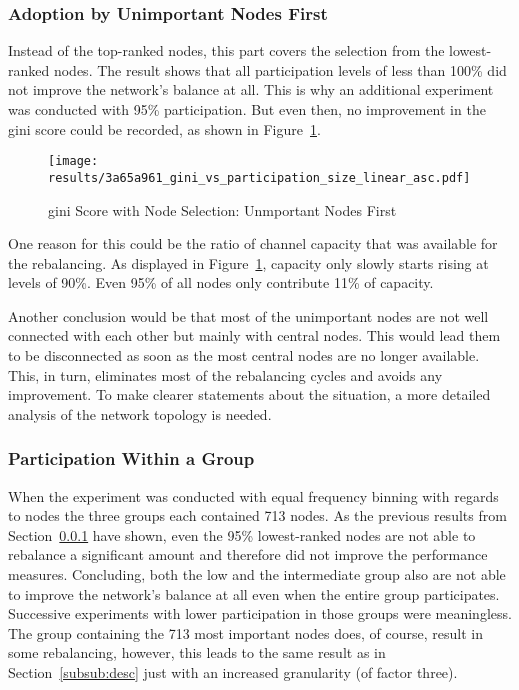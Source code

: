 \documentclass[final]{fhnwreport}       %
\begin{document}
\subsubsection{Adoption by Unimportant Nodes First}\label{subsub:asc}
Instead of the top-ranked nodes, this part covers the selection from the lowest-ranked nodes. The result shows that all participation levels of less than 100\% did not improve the network's balance at all. This is why an additional experiment was conducted with 95\% participation. But even then, no improvement in the \gls{gini} score could be recorded, as shown in Figure~\ref{fig:gini_part_size_linear_asc}.

\begin{figure}[htp]
\centering
\texttt{[image: results/3a65a961\_gini\_vs\_participation\_size\_linear\_asc.pdf]}
\caption{\gls{gini} Score with Node Selection: Unmportant Nodes First}
\label{fig:gini_part_size_linear_asc}
\end{figure}

One reason for this could be the ratio of channel capacity that was available for the rebalancing. As displayed in Figure~\ref{fig:gini_part_size_linear_asc}, capacity only slowly starts rising at levels of 90\%. Even 95\% of all nodes only contribute 11\% of capacity. 

Another conclusion would be that most of the unimportant nodes are not well connected with each other but mainly with central nodes. This would lead them to be disconnected as soon as the most central nodes are no longer available. This, in turn, eliminates most of the rebalancing cycles and avoids any improvement. To make clearer statements about the situation, a more detailed analysis of the network topology is needed.

\subsubsection{Participation Within a Group}
When the experiment was conducted with equal frequency binning with regards to nodes the three groups each contained 713 nodes. As the previous results from Section~\ref{subsub:asc} have shown, even the 95\% lowest-ranked nodes are not able to rebalance a significant amount and therefore did not improve the performance measures. Concluding, both the low and the intermediate group also are not able to improve the network's balance at all even when the entire group participates. Successive experiments with lower participation in those groups were meaningless. The group containing the 713 most important nodes does, of course, result in some rebalancing, however, this leads to the same result as in Section~\ref{subsub:desc} just with an increased granularity (of factor three).
\end{document}
